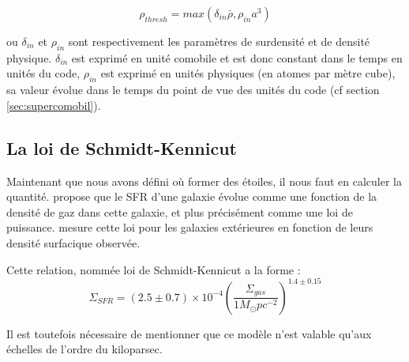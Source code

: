 
\begin{equation}
	\rho_{thresh} = max\left(  \delta_{in} \bar{\rho}, \rho_{in} a^3 \right)
\end{equation} 

ou $\delta_{in}$ et $\rho_{in}$  sont respectivement les paramètres de surdensité et de densité physique.
$\delta_{in}$ est exprimé en unité comobile et est donc constant dans le temps en unités du code,
 $\rho_{in}$ est exprimé en unités physiques (en atomes par mètre cube), sa valeur évolue dans le temps du point de vue des unités du code (cf section \ref{sec:supercomobil}).


\subsection{La loi de Schmidt-Kennicut}
\label{sec:schmidt-kennicut}

Maintenant que nous avons défini où former des étoiles, il nous faut en calculer la quantité.
\cite{1959ApJ...129..243S} propose que le \ac{SFR} d'une galaxie évolue comme une fonction de la densité de gaz dans cette galaxie, et plus précisément comme une loi de puissance.
\cite{1998ApJ...498..541K} mesure cette loi pour les galaxies extérieures en fonction de leurs densité surfacique observée.

Cette relation, nommée loi de Schmidt-Kennicut a la forme :
\begin{equation}
\Sigma_{SFR} = (2.5 \pm 0.7) \times 10^{-4} \left( \frac{\Sigma_{gas}}{1 M_\odot pc^{-2}} \right)^{1.4 \pm 0.15}
\end{equation}

Il est toutefois nécessaire de mentionner que ce modèle n'est valable qu'aux échelles de l'ordre du kiloparsec. %

%
%

